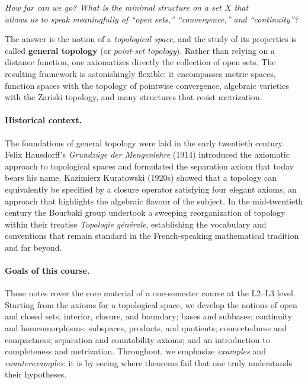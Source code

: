 \documentclass[11pt,a4paper,twoside]{book}
\theoremstyle{remark}
\theoremstyle{definition}
\theoremstyle{definition}
\begin{document}
\medskip
\begin{center}
\itshape
How far can we go?  What is the minimal structure on a set $X$ that\\
allows us to speak meaningfully of ``open sets,'' ``convergence,'' and ``continuity''?
\end{center}
\medskip

The answer is the notion of a \emph{topological space}, and the study of its
properties is called \textbf{general topology} (or \emph{point-set topology}).
Rather than relying on a distance function, one axiomatizes directly the
collection of open sets.  The resulting framework is astonishingly flexible: it
encompasses metric spaces, function spaces with the topology of pointwise
convergence, algebraic varieties with the Zariski topology, and many structures
that resist metrization.

\paragraph{Historical context.}
The foundations of general topology were laid in the early twentieth century.
Felix Hausdorff's \emph{Grundz\"uge der Mengenlehre} (1914) introduced the
axiomatic approach to topological spaces and formulated the separation axiom
that today bears his name.  Kazimierz Kuratowski (1920s) showed that a topology
can equivalently be specified by a closure operator satisfying four elegant
axioms, an approach that highlights the algebraic flavour of the subject.  In
the mid-twentieth century the Bourbaki group undertook a sweeping
reorganization of topology within their treatise \emph{Topologie g\'en\'erale},
establishing the vocabulary and conventions that remain standard in the
French-speaking mathematical tradition and far beyond.

\paragraph{Goals of this course.}
These notes cover the core material of a one-semester course at the L2--L3
level.  Starting from the axioms for a topological space, we develop the
notions of open and closed sets, interior, closure, and boundary; bases and
subbases; continuity and homeomorphisms; subspaces, products, and quotients;
connectedness and compactness; separation and countability axioms; and an
introduction to completeness and metrization.  Throughout, we emphasize
\emph{examples} and \emph{counterexamples}: it is by seeing where theorems
fail that one truly understands their hypotheses.
\end{document}
